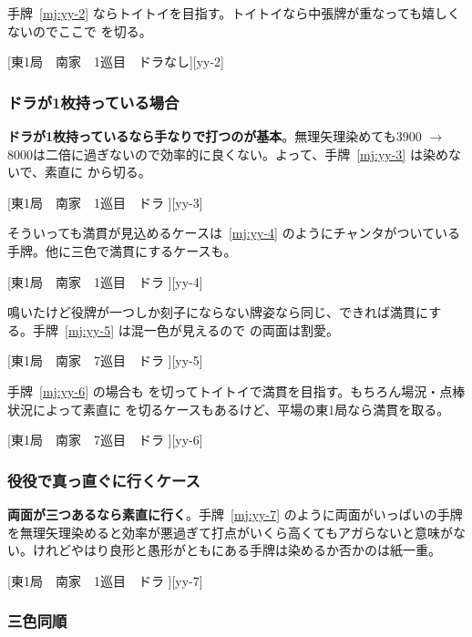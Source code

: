\documentclass[../nankiru_main.tex]{subfiles}
\begin{document}
手牌~\ref{mj:yy-2} ならトイトイを目指す。トイトイなら中張牌が重なっても嬉しくないのでここで  を切る。

[東1局　南家　1巡目　ドラなし][yy-2]


\subsubsection*{ドラが1枚持っている場合}

\textbf{ドラが1枚持っているなら手なりで打つのが基本}。無理矢理染めても3900 $\to$ 8000は二倍に過ぎないので効率的に良くない。よって、手牌~\ref{mj:yy-3} は染めないで、素直に  から切る。

[東1局　南家　1巡目　ドラ ][yy-3]

そういっても満貫が見込めるケースは~\ref{mj:yy-4} のようにチャンタがついている手牌。他に三色で満貫にするケースも。

[東1局　南家　1巡目　ドラ ][yy-4]

鳴いたけど役牌が一つしか刻子にならない牌姿なら同じ、できれば満貫にする。手牌~\ref{mj:yy-5} は混一色が見えるので  の両面は割愛。

[東1局　南家　7巡目　ドラ ][yy-5]

手牌~\ref{mj:yy-6} の場合も  を切ってトイトイで満貫を目指す。もちろん場況・点棒状況によって素直に  を切るケースもあるけど、平場の東1局なら満貫を取る。

[東1局　南家　7巡目　ドラ ][yy-6]


\subsubsection*{役役で真っ直ぐに行くケース}

\textbf{両面が三つあるなら素直に行く}。手牌~\ref{mj:yy-7} のように両面がいっぱいの手牌を無理矢理染めると効率が悪過ぎて打点がいくら高くてもアガらないと意味がない。けれどやはり良形と愚形がともにある手牌は染めるか否かのは紙一重。

[東1局　南家　1巡目　ドラ ][yy-7]


\subsubsection{三色同順}
\end{document}
